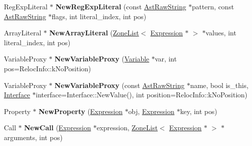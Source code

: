 \begin{DoxyCompactItemize}
\item 
\hypertarget{classv8_1_1internal_1_1_b_a_s_e___e_m_b_e_d_d_e_d_ab6e9aba1e4afb0fd0fb6e917236c6bfb}{}Reg\+Exp\+Literal $\ast$ {\bfseries New\+Reg\+Exp\+Literal} (const \hyperlink{classv8_1_1internal_1_1_ast_raw_string}{Ast\+Raw\+String} $\ast$pattern, const \hyperlink{classv8_1_1internal_1_1_ast_raw_string}{Ast\+Raw\+String} $\ast$flags, int literal\+\_\+index, int pos)\label{classv8_1_1internal_1_1_b_a_s_e___e_m_b_e_d_d_e_d_ab6e9aba1e4afb0fd0fb6e917236c6bfb}

\item 
\hypertarget{classv8_1_1internal_1_1_b_a_s_e___e_m_b_e_d_d_e_d_a1dddbc9e12538a4716e391f60c0dcd10}{}Array\+Literal $\ast$ {\bfseries New\+Array\+Literal} (\hyperlink{classv8_1_1internal_1_1_zone_list}{Zone\+List}$<$ \hyperlink{classv8_1_1internal_1_1_expression}{Expression} $\ast$ $>$ $\ast$values, int literal\+\_\+index, int pos)\label{classv8_1_1internal_1_1_b_a_s_e___e_m_b_e_d_d_e_d_a1dddbc9e12538a4716e391f60c0dcd10}

\item 
\hypertarget{classv8_1_1internal_1_1_b_a_s_e___e_m_b_e_d_d_e_d_a77fe4f5aabfe212aa3b8c3072c879761}{}Variable\+Proxy $\ast$ {\bfseries New\+Variable\+Proxy} (\hyperlink{classv8_1_1internal_1_1_variable}{Variable} $\ast$var, int pos=Reloc\+Info\+::k\+No\+Position)\label{classv8_1_1internal_1_1_b_a_s_e___e_m_b_e_d_d_e_d_a77fe4f5aabfe212aa3b8c3072c879761}

\item 
\hypertarget{classv8_1_1internal_1_1_b_a_s_e___e_m_b_e_d_d_e_d_a329a1aae27293a18dd0bbacd421323cc}{}Variable\+Proxy $\ast$ {\bfseries New\+Variable\+Proxy} (const \hyperlink{classv8_1_1internal_1_1_ast_raw_string}{Ast\+Raw\+String} $\ast$name, bool is\+\_\+this, \hyperlink{classv8_1_1internal_1_1_interface}{Interface} $\ast$interface=Interface\+::\+New\+Value(), int position=Reloc\+Info\+::k\+No\+Position)\label{classv8_1_1internal_1_1_b_a_s_e___e_m_b_e_d_d_e_d_a329a1aae27293a18dd0bbacd421323cc}

\item 
\hypertarget{classv8_1_1internal_1_1_b_a_s_e___e_m_b_e_d_d_e_d_af87000a986e20271bd364fdd36252343}{}Property $\ast$ {\bfseries New\+Property} (\hyperlink{classv8_1_1internal_1_1_expression}{Expression} $\ast$obj, \hyperlink{classv8_1_1internal_1_1_expression}{Expression} $\ast$key, int pos)\label{classv8_1_1internal_1_1_b_a_s_e___e_m_b_e_d_d_e_d_af87000a986e20271bd364fdd36252343}

\item 
\hypertarget{classv8_1_1internal_1_1_b_a_s_e___e_m_b_e_d_d_e_d_aeb20abc7685c344185ed21045e4be098}{}Call $\ast$ {\bfseries New\+Call} (\hyperlink{classv8_1_1internal_1_1_expression}{Expression} $\ast$expression, \hyperlink{classv8_1_1internal_1_1_zone_list}{Zone\+List}$<$ \hyperlink{classv8_1_1internal_1_1_expression}{Expression} $\ast$ $>$ $\ast$arguments, int pos)\label{classv8_1_1internal_1_1_b_a_s_e___e_m_b_e_d_d_e_d_aeb20abc7685c344185ed21045e4be098}


\end{DoxyCompactItemize}
